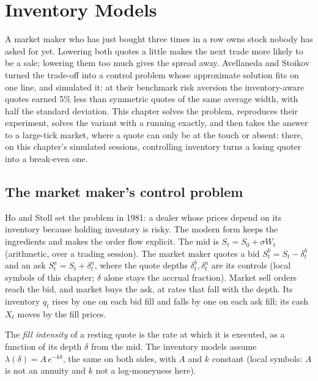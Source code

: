 \chapter{Inventory Models}\label{ch:hf:inventory-models}

A market maker who has just bought three times in a row owns stock nobody has asked for yet. Lowering both quotes a little makes the next trade more
likely to be a sale; lowering them too much gives the spread away. Avellaneda and Stoikov turned the trade-off into a control problem whose
approximate solution fits on one line, and simulated it: at their benchmark risk aversion the inventory-aware quotes earned 5\% less than symmetric
quotes of the same average width, with half the standard deviation. This chapter solves the problem, reproduces their experiment, solves the variant
with a running  exactly, and then takes the answer to a large-tick market, where a quote can only be at the touch or absent: there,
on this chapter's simulated sessions, controlling inventory turns a losing quoter into a break-even one.

\section{The market maker's control problem}

Ho and Stoll set the problem in 1981: a dealer whose prices depend on its inventory because holding inventory is risky. The modern form keeps the
ingredients and makes the order flow explicit. The mid is $S_t=S_0+\sigma W_t$ (arithmetic, over a trading session). The market maker quotes a bid
$S^b_t=S_t-\delta^b_t$ and an ask $S^a_t=S_t+\delta^a_t$, where the quote depths $\delta^b_t,\delta^a_t$ are its controls (local symbols of this
chapter; $\delta$ alone stays the accrual fraction). Market sell orders reach the bid, and market buys the ask, at rates that fall with the depth.
Its inventory $q_t$ rises by one on each bid fill and falls by one on each ask fill; its cash $X_t$ moves by the fill prices.

\begin{definition}\label{def:hf:inventory-models:intensity}
The \emph{fill intensity} of a resting quote is the rate at which it is executed, as a function of its depth $\delta$ from the
mid. The inventory models assume $\lambda(\delta)=A\,e^{-k\delta}$, the same on both sides, with $A$ and $k$ constant (local symbols: $A$ is not an
annuity and $k$ not a log-moneyness here).
\end{definition}

